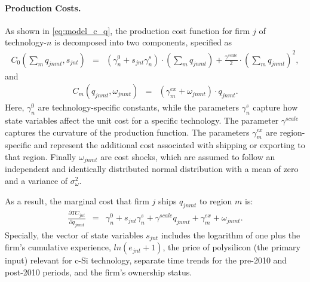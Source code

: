\documentclass[12pt, letter]{article}
\begin{document}
\paragraph{Production Costs.} 
As shown in \eqref{eq:model_c_q}, the production cost function for firm $j$ of technology-$n$ is decomposed into two components, specified as
\begin{eqnarray*}
   C_0\!\left(\sum_m q_{jnmt},s_{jnt}\right) &=& (\gamma_{n}^0 + s_{jnt} \gamma_n^s) \cdot (\sum_m q_{jnmt}) + \frac{\gamma^{scale}}{2} \cdot (\sum_m q_{jnmt})^2,
\end{eqnarray*}
and
\begin{eqnarray*}
   C_m(q_{jnmt},\omega_{jnmt}) &=& (\gamma_{m}^{ex}+\omega_{jnmt}) \cdot q_{jnmt}.
\end{eqnarray*}
Here, $\gamma_{n}^0$ are technology-specific constants, while the parameters $\gamma_n^s$ capture how state variables affect the unit cost for a specific technology. The parameter $\gamma^{scale}$ captures the curvature of the production function. The parameters $\gamma_{m}^{ex}$ are region-specific and represent the additional cost associated with shipping or exporting to that region. Finally $\omega_{jnmt}$ are cost shocks, which are assumed to follow an independent and identically distributed normal distribution with a mean of zero and a variance of $\sigma_\omega^2$.

As a result, the marginal cost that firm $j$ ships $q_{jnmt}$ to region $m$ is:
\begin{eqnarray}
  \frac{\partial TC_{jnt}}{\partial q_{jnmt}} &=&  \gamma_{n}^0 + s_{jnt} \gamma_n^s + \gamma^{scale} q_{jnmt}  +\gamma_{m}^{ex}  +\omega_{jnmt}. \label{eq:est_mc_q}
\end{eqnarray}
Specially, the vector of state variables $s_{jnt}$ includes the logarithm of one plus the firm's cumulative experience, $ln(e_{jnt}+1)$, the price of polysilicon (the primary input) relevant for c-Si technology, separate time trends for the pre-2010  and post-2010 periods, and the firm's ownership status.

\end{document}

